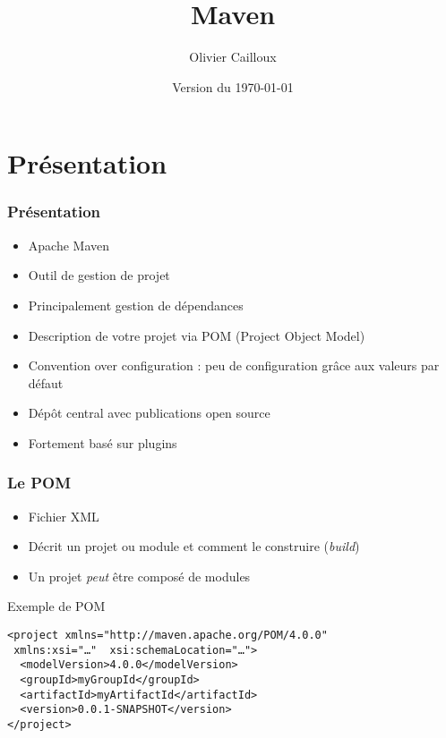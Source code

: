 \documentclass[english, french]{beamer}
\title{Maven}
\author{Olivier Cailloux}
\institute[LAMSADE]{LAMSADE, Université Paris-Dauphine}
\date{Version du \today}
\begin{document}


\begin{frame}[plain]
   \titlepage
\end{frame}
\addtocounter{framenumber}{-1}

\section{Présentation}
\begin{frame}
	\frametitle{Présentation}
	\begin{itemize}
		\item Apache Maven
		\item Outil de gestion de projet
		\item Principalement gestion de dépendances
		\item Description de votre projet via POM (Project Object Model)
		\item Convention over configuration : peu de configuration grâce aux valeurs par défaut
		\item Dépôt central avec publications open source
		\item Fortement basé sur plugins
	\end{itemize}
\end{frame}

\begin{frame}[fragile]
	\frametitle{Le POM}
	\begin{itemize}
		\item Fichier XML
		\item Décrit un projet ou module et comment le construire (\emph{build})
		\item Un projet \emph{peut} être composé de modules
	\end{itemize}
	\begin{block}{Exemple de POM}
		\begin{lstlisting}
<project xmlns="http://maven.apache.org/POM/4.0.0"
 xmlns:xsi="…"  xsi:schemaLocation="…">
  <modelVersion>4.0.0</modelVersion>
  <groupId>myGroupId</groupId>
  <artifactId>myArtifactId</artifactId>
  <version>0.0.1-SNAPSHOT</version>
</project>
		\end{lstlisting}
	\end{block}
\end{frame}
\end{document}

